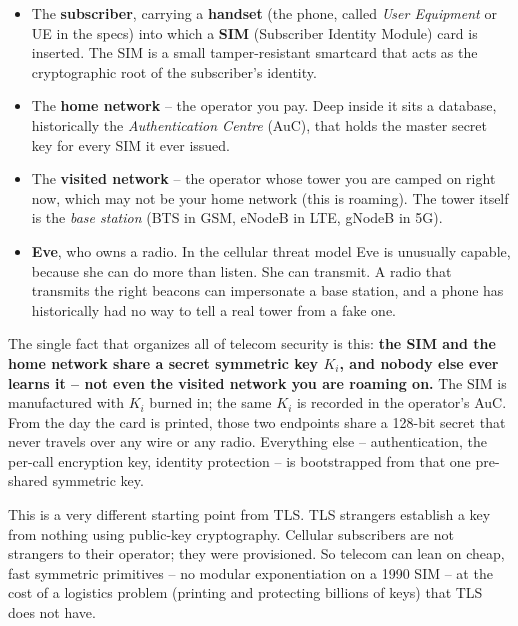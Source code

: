 \begin{itemize}
  \item The \textbf{subscriber}, carrying a \textbf{handset} (the phone, called \emph{User Equipment} or UE in the specs) into which a \textbf{SIM} (Subscriber Identity Module) card is inserted. The SIM is a small tamper-resistant smartcard that acts as the cryptographic root of the subscriber's identity.
  \item The \textbf{home network} -- the operator you pay. Deep inside it sits a database, historically the \emph{Authentication Centre} (AuC), that holds the master secret key for every SIM it ever issued.
  \item The \textbf{visited network} -- the operator whose tower you are camped on right now, which may not be your home network (this is roaming). The tower itself is the \emph{base station} (BTS in GSM, eNodeB in LTE, gNodeB in 5G).
  \item \textbf{Eve}, who owns a radio. In the cellular threat model Eve is unusually capable, because she can do more than listen. She can transmit. A radio that transmits the right beacons can impersonate a base station, and a phone has historically had no way to tell a real tower from a fake one.
\end{itemize}

\begin{intuitionbox}
The single fact that organizes all of telecom security is this: \textbf{the SIM and the home network share a secret symmetric key $K_i$, and nobody else ever learns it -- not even the visited network you are roaming on.} The SIM is manufactured with $K_i$ burned in; the same $K_i$ is recorded in the operator's AuC. From the day the card is printed, those two endpoints share a 128-bit secret that never travels over any wire or any radio. Everything else -- authentication, the per-call encryption key, identity protection -- is bootstrapped from that one pre-shared symmetric key.

This is a very different starting point from TLS. TLS strangers establish a key from nothing using public-key cryptography. Cellular subscribers are not strangers to their operator; they were provisioned. So telecom can lean on cheap, fast symmetric primitives -- no modular exponentiation on a 1990 SIM -- at the cost of a logistics problem (printing and protecting billions of keys) that TLS does not have.
\end{intuitionbox}

